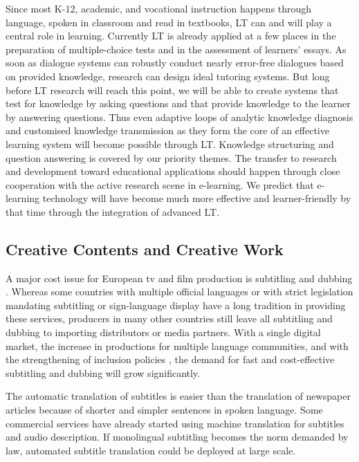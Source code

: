 \documentclass[10pt, plain]{../../metanetpaper}
\begin{document}
\begin{multicols}{2}
Since most K-12, academic, and vocational instruction happens through language, spoken in classroom and read in textbooks, LT can and will play a central role in learning. Currently LT is already applied at a few places in the preparation of multiple-choice tests and in the assessment of learners’ essays. As soon as dialogue systems can robustly conduct nearly error-free dialogues based on provided knowledge, research can design ideal tutoring systems. But long before LT research will reach this point, we will be able to create systems that test for knowledge by asking questions and that provide knowledge to the learner by answering questions. Thus even adaptive loops of analytic knowledge diagnosis and customised knowledge transmission as they form the core of an effective learning system will become possible through LT. Knowledge structuring and question answering is covered by our priority themes. The transfer to research and development toward educational applications should happen through close cooperation with the active research scene in e-learning. We predict that e-learning technology will have become much more effective and learner-friendly by that time through the integration of advanced LT.


\subsection{Creative Contents and Creative Work}
\label{sec:lt-creative-contents}

A major cost issue for European tv and film production is subtitling and dubbing \cite{eurobarometer2011}. Whereas some countries with multiple official languages or with strict legislation mandating subtitling or sign-language display have a long tradition in providing these services, producers in many other countries still leave all subtitling and dubbing to importing distributors or media partners. With a single digital market, the increase in productions for multiple language communities, and with the strengthening of inclusion policies \cite{medier12}, the demand for fast and cost-effective subtitling and dubbing will grow significantly.

The automatic translation of subtitles is easier than the translation of newspaper articles because of shorter and simpler sentences in spoken language. Some commercial services have already started using machine translation for subtitles and audio description. If monolingual subtitling becomes the norm demanded by law, automated subtitle translation could be deployed at large scale.
 

\end{multicols}
\end{document}
